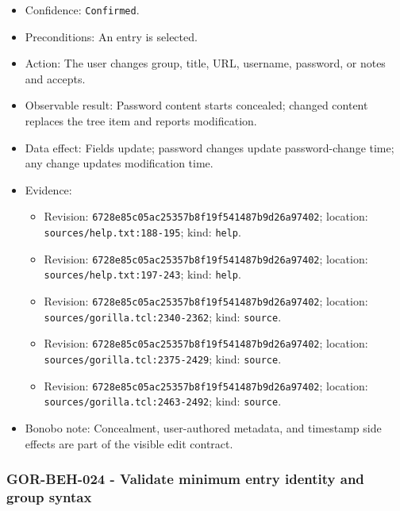 \documentclass[
  letterpaper,
]{article}
\newcommand{\passthrough}[1]{#1}
\providecommand{\tightlist}{%
  \setlength{\itemsep}{0pt}\setlength{\parskip}{0pt}}
\begin{document}
\begin{itemize}
\tightlist
\item
  Confidence: \passthrough{\lstinline!Confirmed!}.
\item
  Preconditions: An entry is selected.
\item
  Action: The user changes group, title, URL, username, password, or notes and accepts.
\item
  Observable result: Password content starts concealed; changed content replaces the tree item and reports modification.
\item
  Data effect: Fields update; password changes update password-change time; any change updates modification time.
\item
  Evidence:

  \begin{itemize}
  \tightlist
  \item
    Revision: \nolinkurl{6728e85c05ac25357b8f19f541487b9d26a97402}; location: \nolinkurl{sources/help.txt:188-195};
    kind: \passthrough{\lstinline!help!}.
  \item
    Revision: \nolinkurl{6728e85c05ac25357b8f19f541487b9d26a97402}; location: \nolinkurl{sources/help.txt:197-243};
    kind: \passthrough{\lstinline!help!}.
  \item
    Revision: \nolinkurl{6728e85c05ac25357b8f19f541487b9d26a97402}; location: \nolinkurl{sources/gorilla.tcl:2340-2362};
    kind: \passthrough{\lstinline!source!}.
  \item
    Revision: \nolinkurl{6728e85c05ac25357b8f19f541487b9d26a97402}; location: \nolinkurl{sources/gorilla.tcl:2375-2429};
    kind: \passthrough{\lstinline!source!}.
  \item
    Revision: \nolinkurl{6728e85c05ac25357b8f19f541487b9d26a97402}; location: \nolinkurl{sources/gorilla.tcl:2463-2492};
    kind: \passthrough{\lstinline!source!}.
  \end{itemize}
\item
  Bonobo note: Concealment, user-authored metadata, and timestamp side effects are part of the visible edit contract.
\end{itemize}

\subsubsection{GOR-BEH-024 - Validate minimum entry identity and group
syntax}\label{gor-beh-024---validate-minimum-entry-identity-and-group-syntax}
\end{document}
